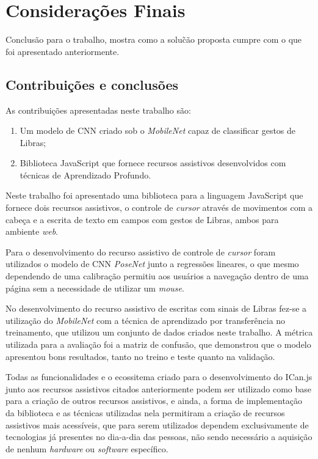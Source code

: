 \newpage
\chapter{Considerações Finais}
Conclusão para o trabalho, mostra como a solu\~c\~ao proposta cumpre com o que foi apresentado anteriormente.

\section{Contribuições e conclusões}

\par As contribuições apresentadas neste trabalho são:

\begin{enumerate}
    \item Um modelo de CNN criado sob o \textit{MobileNet} capaz de classificar gestos de Libras;
    \item Biblioteca JavaScript que fornece recursos assistivos desenvolvidos com técnicas de Aprendizado Profundo.
\end{enumerate}

\par Neste trabalho foi apresentado uma biblioteca para a linguagem JavaScript que fornece dois recursos assistivos, o controle de \textit{cursor} através de movimentos com a cabeça e a escrita de texto em campos com gestos de Libras, ambos para ambiente \textit{web}.

\par Para o desenvolvimento do recurso assistivo de controle de \textit{cursor} foram utilizados o modelo de CNN \textit{PoseNet} junto a regressões lineares, o que mesmo dependendo de uma calibração permitiu aos usuários a navegação dentro de uma página sem a necessidade de utilizar um \textit{mouse}.

\par No desenvolvimento do recurso assistivo de escritas com sinais de Libras fez-se a utilização do \textit{MobileNet} com a técnica de aprendizado por transferência no treinamento, que utilizou um conjunto de dados criados neste trabalho. A métrica utilizada para a avaliação foi a matriz de confusão, que demonstrou que o modelo apresentou bons resultados, tanto no treino e teste quanto na validação.

\par Todas as funcionalidades e o ecossitema criado para o desenvolvimento do ICan.js junto aos recursos assistivos citados anteriormente podem ser utilizado como base para a criação de outros recursos assistivos, e ainda, a forma de implementação da biblioteca e as técnicas utilizadas nela permitiram a criação de recursos assistivos mais acessíveis, que para serem utilizados dependem exclusivamente de tecnologias já presentes no dia-a-dia das pessoas, não sendo necessário a aquisição de nenhum \textit{hardware} ou \textit{software} específico.

